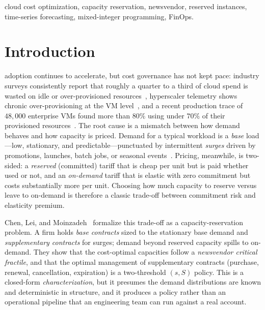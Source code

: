 \documentclass[10pt,journal]{IEEEtran}
\begin{document}
\begin{IEEEkeywords}
cloud cost optimization, capacity reservation, newsvendor, reserved instances,
time-series forecasting, mixed-integer programming, FinOps.
\end{IEEEkeywords}

\IEEEpeerreviewmaketitle

\section{Introduction}\label{sec:intro}
 adoption continues to accelerate, but cost
governance has not kept pace: industry surveys consistently report that
roughly a quarter to a third of cloud spend is wasted on idle or
over-provisioned resources~\cite{flexera2024soc,everman2022waste}, hyperscaler
telemetry shows chronic over-provisioning at the VM
level~\cite{cortez2017resource,reidys2025coach}, and a recent production trace
of $48{,}000$ enterprise VMs found more than $80\%$ using under $70\%$ of
their provisioned resources~\cite{uhlig2025sap}. The root cause is a mismatch
between how demand behaves and how capacity is priced. Demand for a typical
workload is a \emph{base} load---low, stationary, and
predictable---punctuated by intermittent \emph{surges} driven by promotions,
launches, batch jobs, or seasonal
events~\cite{fox2009berkeley,shen2015bitbrains,tirmazi2020borgng}. Pricing,
meanwhile, is two-sided: a \emph{reserved} (committed) tariff that is cheap
per unit but is paid whether used or not, and an \emph{on-demand} tariff that
is elastic with zero commitment but costs substantially more per unit.
Choosing how much capacity to reserve versus leave to on-demand is therefore
a classic trade-off between commitment risk and elasticity premium.

Chen, Lei, and Moinzadeh~\cite{chen2024capacity} formalize this trade-off as
a capacity-reservation problem. A firm holds \emph{base contracts} sized to
the stationary base demand and \emph{supplementary contracts} for surges;
demand beyond reserved capacity spills to on-demand. They show that the
cost-optimal capacities follow a \emph{newsvendor critical fractile}, and
that the optimal management of supplementary contracts (purchase, renewal,
cancellation, expiration) is a two-threshold $(s,S)$ policy. This is a
closed-form \emph{characterization}, but it presumes the demand distributions
are known and deterministic in structure, and it produces a policy rather
than an operational pipeline that an engineering team can run against a real
account.
\end{document}
